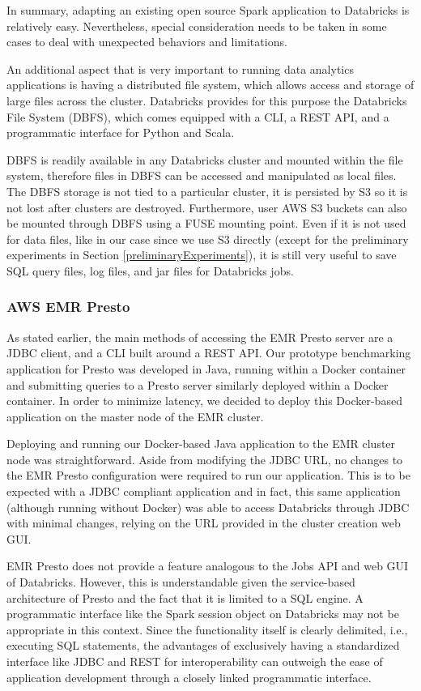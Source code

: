 In summary, adapting an existing open source Spark application to Databricks is relatively easy. Nevertheless, special consideration needs to be taken in some cases to deal with unexpected behaviors and limitations.

An additional aspect that is very important to running data analytics applications is having a distributed file system, which allows access and storage of large files across the cluster. Databricks provides for this purpose the Databricks File System (DBFS), which comes equipped with a CLI, a REST API, and a programmatic interface for Python and Scala.

DBFS is readily available in any Databricks cluster and mounted within the file system, therefore files in DBFS can be accessed and manipulated as local files. The DBFS storage is not tied to a particular cluster, it is persisted by S3 so it is not lost after clusters are destroyed. Furthermore, user AWS S3 buckets can also be mounted through DBFS using a FUSE mounting point. Even if it is not used for data files, like in our case since we use S3 directly (except for the preliminary experiments in Section \ref{preliminaryExperiments}), it is still very useful to save SQL query files, log files, and jar files for Databricks jobs.

\subsubsection{AWS EMR Presto}

As stated earlier, the main methods of accessing the EMR Presto server are a JDBC client, and a CLI built around a REST API. Our prototype benchmarking application for Presto was developed in Java, running within a Docker container and submitting queries to a Presto server similarly deployed within a Docker container. In order to minimize latency, we decided to deploy this Docker-based application on the master node of the EMR cluster.

Deploying and running our Docker-based Java application to the EMR cluster node was straightforward. Aside from modifying the JDBC URL, no changes to the EMR Presto configuration were required to run our application. This is to be expected with a JDBC compliant application and in fact, this same application (although running without Docker) was able to access Databricks through JDBC with minimal changes, relying on the URL provided in the cluster creation web GUI.

EMR Presto does not provide a feature analogous to the Jobs API and web GUI of Databricks. However, this is understandable given the service-based architecture of Presto and the fact that it is limited to a SQL engine. A programmatic interface like the Spark session object on Databricks may not be appropriate in this context. Since the functionality itself is clearly delimited, i.e., executing SQL statements, the advantages of exclusively having a standardized interface like JDBC and REST for interoperability can outweigh the ease of application development through a closely linked programmatic interface.

